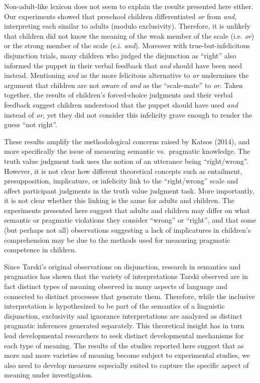 \documentclass[,man,floatsintext]{apa6}
\begin{document}
Non-adult-like lexicon does not seem to explain the results presented here either. Our experiments showed that preschool children differentiated \emph{or} from \emph{and}, interpreting each similar to adults (modulo exclusivity). Therefore, it is unlikely that children did not know the meaning of the weak member of the scale (i.e. \emph{or}) or the strong member of the scale (e.i. \emph{and}). Moreover with true-but-infelicitous disjunction trials, many children who judged the disjunction as \enquote{right} also informed the puppet in their verbal feedback that \emph{and} should have been used instead. Mentioning \emph{and} as the more felicitous alternative to \emph{or} undermines the argument that children are not aware of \emph{and} as the \enquote{scale-mate} to \emph{or}. Taken together, the results of children's forced-choice judgments and their verbal feedback suggest children understood that the puppet should have used \emph{and} instead of \emph{or}, yet they did not consider this infelicity grave enough to render the guess \enquote{not right}.

These results amplify the methodological concerns raised by Katsos (2014), and more specifically the issue of measuring semantic vs.~pragmatic knowledge. The truth value judgment task uses the notion of an utterance being \enquote{right/wrong}. However, it is not clear how different theoretical concepts such as entailment, presupposition, implicature, or infelicity link to the \enquote{right/wrong} scale and affect participant judgments in the truth value judgment task. More importantly, it is not clear whether this linking is the same for adults and children. The experiments presented here suggest that adults and children may differ on what semantic or pragmatic violations they consider \enquote{wrong} or \enquote{right}, and that some (but perhaps not all) observations suggesting a lack of implicatures in children's comprehension may be due to the methods used for measuring pragmatic competence in children.

Since Tarski's original observations on disjunction, research in semantics and pragmatics has shown that the variety of interpretations Tarski observed are in fact distinct types of meaning observed in many aspects of language and connected to distinct processes that generate them. Therefore, while the inclusive interpretation is hypothesized to be part of the semantics of a linguistic disjunction, exclusivity and ignorance interpretations are analyzed as distinct pragmatic inferences generated separately. This theoretical insight has in turn lead developmental researchers to seek distinct developmental mechanisms for each type of meaning. The results of the studies reported here suggest that as more and more varieties of meaning become subject to experimental studies, we also need to develop measures especially suited to capture the specific aspect of meaning under investigation.
\end{document}
